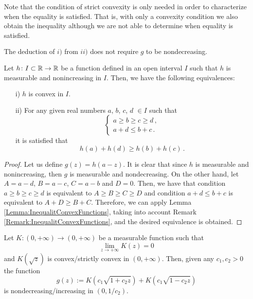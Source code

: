 \begin{remark}
\label{Remark:InequalitConvexFunctions} Note that the condition of strict convexity is only needed
in order to characterize when the equality is satisfied. That is, with only a convexity condition
we also obtain the inequality although we are not able to determine when equality is satisfied.
\end{remark}
\begin{remark}
\label{Remark:LeftImplicationDoNotRequireNondecreasing}
The deduction of $i)$ from $ii)$ does not require $g$ to be nondecreasing.
\end{remark}

\begin{corollary}
\label{Cor:hDecreasingConvex} Let $h \colon I\subset \mathbb{R} \to \mathbb{R}$ be a function defined in an open
interval $I$ such that $h$ is measurable and nonincreasing in $I$. Then, we have the following
equivalences:
\begin{enumerate}
\item[i)] $h$ is convex in $I$.
\item[ii)] For any given real numbers $a$, $b$, $c$, $d$ $\in I$ such that
\begin{equation}
\label{Eq:AssumptionsInequalitiesabcd}
\begin{cases}
a \geq b \geq c \geq d \,, \\
a + d \leq b + c\,.
\end{cases}
\end{equation}
it is satisfied that
$$ h(a) + h(d) \geq h(b) + h(c)\,.$$
\end{enumerate}
\end{corollary}

\begin{proof}
Let us define $g(z) = h(a-z)$. It is clear that since $h$ is measurable and nonincreasing, then $g$
is measurable and nondecreasing. On the other hand, let $A=a-d$, $B=a-c$, $C=a-b$ and $D=0$. Then,
we have that condition $a \geq b \geq c \geq d$ is equivalent to $A\geq B \geq C \geq D$ and
condition $a+d\leq b+c$ is equivalent to $A+D\geq B+C$. Therefore, we can apply Lemma
\ref{Lemma:InequalitConvexFunctions}, taking into account Remark
\ref{Remark:InequalitConvexFunctions}, and the desired equivalence is obtained.
\end{proof}


\begin{lemma}
\label{Lemma:gNondecreasing}
Let $K:(0,+\infty) \to (0,+\infty)$ be a measurable function such that
$$ \lim_{z\to+\infty} K(z) = 0 $$
and $ K(\sqrt{z}) $ is convex/strictly convex in $(0,+\infty)$. Then, given any $c_1,c_2>0$ the
function
$$
g(z) := K(c_1 \sqrt{1 + c_2 z}) +  K(c_1 \sqrt{1 - c_2 z})
$$
is nondecreasing/increasing in $(0, 1/c_2)$.
\end{lemma}

